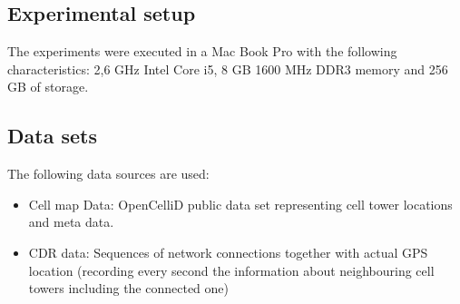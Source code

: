 \subsection{Experimental setup}
The experiments were executed in a Mac Book Pro with the following characteristics: 2,6 GHz Intel Core i5, 8 GB 1600 MHz DDR3 memory and 256 GB of storage.

\subsection{Data sets}
The following data sources are used:
\begin{itemize}
\item Cell map Data: OpenCelliD public data set representing cell tower locations and meta data.
\item CDR data: Sequences of network connections together with actual GPS location (recording every second the information about neighbouring cell towers including the connected one)
\end{itemize}

